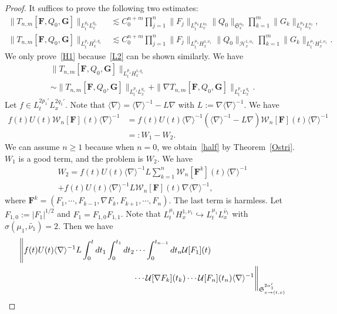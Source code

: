 \documentclass[10pt,a4paper]{amsart}
\newcommand{\vF}{{\mathbf{F}}}
\newcommand{\vG}{{\mathbf{G}}}
\newcommand{\CH}{\mathcal{H}}
\newcommand{\CU}{\mathcal{U}}
\newcommand{\CW}{\mathcal{W}}
\newcommand{\FS}{\mathfrak{S}}
\newcommand{\al}{\alpha}
\newcommand{\si}{\sigma}
\newcommand{\wt}{\widetilde}
\newcommand{\sd}{\langle \nabla \rangle}
\newcommand{\sdi}{\sd^{-1}}
\newcommand{\tx}{{t,x}}
\newcommand{\na}{\nabla}
\newcommand{\ls}{\lesssim}
\begin{document}
\begin{proof}
It suffices to prove the following two estimates:
\begin{align}
\|T_{n,m} [\vF,Q_0,\vG]\|_{L^{p_0}_t L^{q_0}_x}
&\ls C_0^{n+m}
\prod_{j=1}^n \|F_j\|_{L^{\mu_0}_t L^{\nu_0}_x}
\|Q_0\|_{\FS^{\al_0}_x}
\prod_{k=1}^m \|G_k\|_{L^{\mu_0}_t L^{\nu_0}_x} \label{L2}
,
\\
\|T_{n,m} [\vF,Q_0,\vG]\|_{L^{p_1}_t H^{1,q_1}_x}
&\ls C_0^{n+m}
\prod_{j=1}^n \|F_j\|_{L^{\mu_1}_t H^{1,\nu_1}_x}
\|Q_0\|_{\CH^{1, \al_1}_x}
\prod_{k=1}^m \|G_k\|_{L^{\mu_1}_t H^{1,\nu_1}_x}. \label{H1}
\end{align}
We only prove~\eqref{H1} because~\eqref{L2} can be shown similarly. We have
\begin{multline}
\|T_{n,m}[\vF,Q_0,\vG]\|_{L^{p_1}_t H^{1,q_1}_x} \\
\sim \|T_{n,m}[\vF,Q_0,\vG]\|_{L^{p_1}_t L^{q_1}_x} + \|\na T_{n,m}[\vF,Q_0,\vG]\|_{L^{p_1}_t L^{q_1}_x}.
\end{multline}
Let $f \in L^{2p_1'}_t L^{2q_1'}_x$. Note that $\sd = \sdi - L \na$ with $L:= \na \sdi$. We have
\begin{equation}
\begin{split}
f(t)U(t)\CW_n[\vF](t) \sd^{-1} &= f(t)U(t)\sdi \left(\sdi - L\na\right)\CW_n[\vF](t) \sd^{-1} \\
&=:W_1 - W_2.
\end{split}
\end{equation}
We can assume $n \ge 1$ because when $n=0$, we obtain~\eqref{half} by Theorem~\ref{Ostri}. $W_1$ is a good term, and the problem is $W_2$. We have
\begin{multline}
W_2 = f(t)U(t)\sdi L \sum_{k=1}^n \CW_n[\vF^k](t) \sd^{-1} \\+ f(t)U(t)\sdi L \CW_n[\vF](t) \na \sd^{-1},
\end{multline}
where $\vF^k = (F_1, \cdots, F_{k-1}, \na F_k, F_{k+1}, \cdots, F_n)$. The last term is harmless. Let $F_{1,0}:= |F_1|^{1/2}$ and $F_1 = F_{1,0}F_{1,1}$. Note that $L^{\mu_1}_t H^{1,\nu_1}_x \hookrightarrow L^{\mu_1}_t L^{\wt{\nu_1}}_x$ with $\si(\mu_1, \wt{\nu_1}) =2$. Then we have
\begingroup
\allowdisplaybreaks
\begin{align}
&\Bigg\| f(t)U(t)\sdi L
\int_0^t dt_1
\int_0^{t_1} dt_2 \cdots \int_0^{t_{n-1}} dt_n
\CU[F_1](t) \\
&\mkern250mu\cdots \CU[\na F_k](t_k) \cdots \CU[F_n](t_n) \sdi\Bigg\|_{\FS^{2\al_1'}_{x \to (\tx)}} \nonumber\\

\end{align}
\end{proof}
\end{document}
